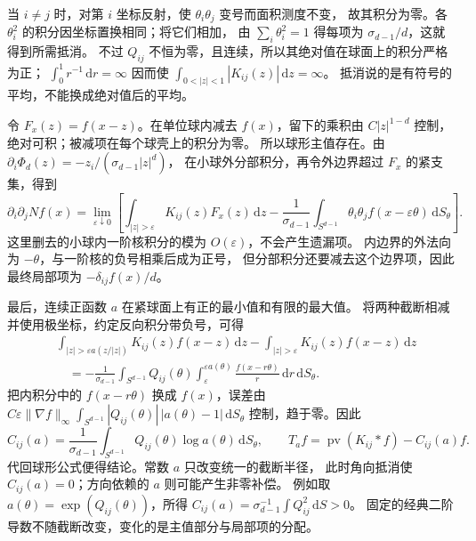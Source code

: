 \begin{solution}
当 \(i\ne j\) 时，对第 \(i\) 坐标反射，使 \(\theta_i\theta_j\) 变号而面积测度不变，
故其积分为零。各 \(\theta_i^2\) 的积分因坐标置换相同；将它们相加，
由 \(\sum_i\theta_i^2=1\) 得每项为 \(\sigma_{d-1}/d\)，这就得到所需抵消。
不过 \(Q_{ij}\) 不恒为零，且连续，所以其绝对值在球面上的积分严格为正；
\(\int_0^1r^{-1}\,\mathrm{d}r=\infty\) 因而使
\(\int_{0<|z|<1}|K_{ij}(z)|\,\mathrm{d}z=\infty\)。
抵消说的是有符号的平均，不能换成绝对值后的平均。

令 \(F_x(z)=f(x-z)\)。在单位球内减去 \(f(x)\)，留下的乘积由
\(C|z|^{1-d}\) 控制，绝对可积；被减项在每个球壳上的积分为零。
所以球形主值存在。由 \(\partial_i\Phi_d(z)=-z_i/(\sigma_{d-1}|z|^d)\)，
在小球外分部积分，再令外边界超过 \(F_x\) 的紧支集，得到
\[
 \partial_i\partial_jNf(x)=
 \lim_{\varepsilon\downarrow0}\left[
 \int_{|z|>\varepsilon}K_{ij}(z)F_x(z)\,\mathrm{d}z
 -\frac1{\sigma_{d-1}}\int_{S^{d-1}}
       \theta_i\theta_j f(x-\varepsilon\theta)\,\mathrm{d}S_\theta
 \right].
\]
这里删去的小球内一阶核积分的模为 \(O(\varepsilon)\)，不会产生遗漏项。
内边界的外法向为 \(-\theta\)，与一阶核的负号相乘后成为正号，
但分部积分还要减去这个边界项，因此最终局部项为
\(-\delta_{ij}f(x)/d\)。

最后，连续正函数 \(a\) 在紧球面上有正的最小值和有限的最大值。
将两种截断相减并使用极坐标，约定反向积分带负号，可得
\[
 \begin{aligned}
 &\int_{|z|>\varepsilon a(z/|z|)}K_{ij}(z)f(x-z)\,\mathrm{d}z
 -\int_{|z|>\varepsilon}K_{ij}(z)f(x-z)\,\mathrm{d}z\\
 &\quad=-\frac1{\sigma_{d-1}}\int_{S^{d-1}}Q_{ij}(\theta)
           \int_\varepsilon^{\varepsilon a(\theta)}
                \frac{f(x-r\theta)}r\,\mathrm{d}r\,\mathrm{d}S_\theta.
 \end{aligned}
\]
把内积分中的 \(f(x-r\theta)\) 换成 \(f(x)\)，误差由
\(C\varepsilon\|\nabla f\|_\infty
 \int_{S^{d-1}}|Q_{ij}(\theta)|\,|a(\theta)-1|\,\mathrm{d}S_\theta\)
控制，趋于零。因此
\[
 C_{ij}(a)=\frac1{\sigma_{d-1}}\int_{S^{d-1}}
           Q_{ij}(\theta)\log a(\theta)\,\mathrm{d}S_\theta,\qquad
 T_af=\operatorname{pv}(K_{ij}*f)-C_{ij}(a)f.
\]
代回球形公式便得结论。常数 \(a\) 只改变统一的截断半径，
此时角向抵消使 \(C_{ij}(a)=0\)；方向依赖的 \(a\) 则可能产生非零补偿。
例如取 \(a(\theta)=\exp(Q_{ij}(\theta))\)，所得
\(C_{ij}(a)=\sigma_{d-1}^{-1}\int Q_{ij}^2\,\mathrm{d}S>0\)。
固定的经典二阶导数不随截断改变，变化的是主值部分与局部项的分配。
\end{solution}
